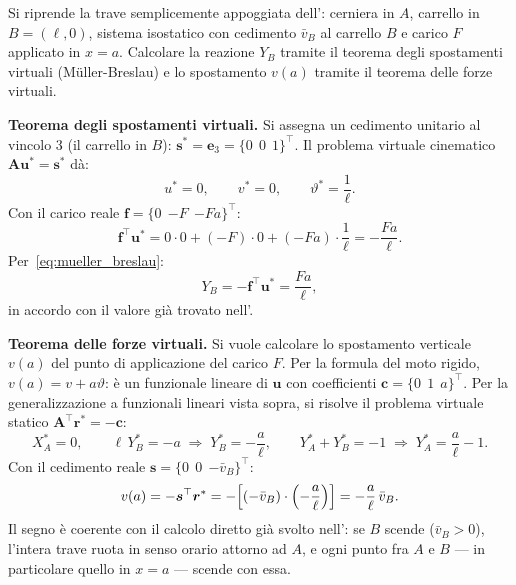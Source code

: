 \begin{esempio}
	\label{ex:trave_semplice_virt}
	Si riprende la trave semplicemente appoggiata
	dell': cerniera in $A$,
	carrello in $B=(\ell,0)$, sistema isostatico con
	cedimento $\bar v_B$ al carrello $B$ e carico $F$
	applicato in $x=a$. Calcolare la reazione $Y_B$ tramite
	il teorema degli spostamenti virtuali (Müller-Breslau) e
	lo spostamento $v(a)$ tramite il teorema delle forze
	virtuali.
	
	\begin{svolgimento}
		
		\noindent\textbf{Teorema degli spostamenti virtuali.}
		Si assegna un cedimento unitario al vincolo 3 (il
		carrello in $B$): $\bm s^*=\bm e_3=\{0\;\,0\;\,1\}^\top$.
		Il problema virtuale cinematico $\bm A\bm u^*=\bm s^*$ dà:
		\begin{equation*}
			u^*=0,\qquad v^*=0,\qquad \vartheta^*=\frac{1}{\ell}.
		\end{equation*}
		Con il carico reale $\bm f=\{0\;\,{-F}\;\,{-Fa}\}^\top$:
		\begin{equation*}
			\bm f^\top\bm u^* =
			0\cdot 0+(-F)\cdot 0+(-Fa)\cdot\frac{1}{\ell}
			= -\frac{Fa}{\ell}.
		\end{equation*}
		Per~\eqref{eq:mueller_breslau}:
		\begin{equation*}
			Y_B=-\bm f^\top\bm u^*=\frac{Fa}{\ell},
		\end{equation*}
		in accordo con il valore già trovato
		nell'.
		
		\noindent\textbf{Teorema delle forze virtuali.}
		Si vuole calcolare lo spostamento verticale $v(a)$ del
		punto di applicazione del carico $F$. Per la formula del
		moto rigido, $v(a)=v+a\vartheta$: è un funzionale lineare
		di $\bm u$ con coefficienti $\bm c=\{0\;\,1\;\,a\}^\top$.
		Per la generalizzazione a funzionali lineari vista sopra,
		si risolve il problema virtuale statico
		$\bm A^\top\bm r^*=-\bm c$:
		\begin{equation*}
			X_A^*=0,\qquad
			\ell\,Y_B^*=-a \;\Longrightarrow\; Y_B^*=-\frac{a}{\ell},
			\qquad
			Y_A^*+Y_B^*=-1 \;\Longrightarrow\;
			Y_A^*=\frac{a}{\ell}-1.
		\end{equation*}
		Con il cedimento reale $\bm s=\{0\;\,0\;\,{-\bar v_B}\}^\top$:
		\begin{equation*}
			v(a) = -\bm s^\top\bm r^* =
			-\Bigl[(-\bar v_B)\cdot\Bigl(-\frac{a}{\ell}\Bigr)\Bigr]
			= -\frac{a}{\ell}\,\bar v_B.
		\end{equation*}
		Il segno è coerente con il calcolo diretto già svolto
		nell': se $B$ scende
		($\bar v_B>0$), l'intera trave ruota in senso orario
		attorno ad $A$, e ogni punto fra $A$ e $B$ --- in
		particolare quello in $x=a$ --- scende con essa.
		

\end{svolgimento}
\end{esempio}
